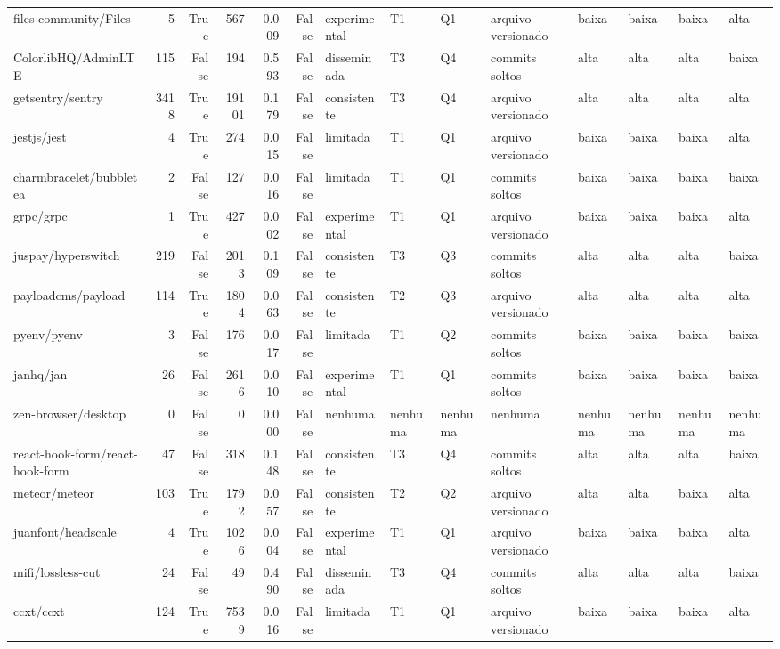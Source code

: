 \begin{tabular}{lrrrrrllllllll}
files-community/Files & 5 & True & 567 & 0.009 & False & experimental & T1 & Q1 & arquivo versionado & baixa & baixa & baixa & alta \\
ColorlibHQ/AdminLTE & 115 & False & 194 & 0.593 & False & disseminada & T3 & Q4 & commits soltos & alta & alta & alta & baixa \\
getsentry/sentry & 3418 & True & 19101 & 0.179 & False & consistente & T3 & Q4 & arquivo versionado & alta & alta & alta & alta \\
jestjs/jest & 4 & True & 274 & 0.015 & False & limitada & T1 & Q1 & arquivo versionado & baixa & baixa & baixa & alta \\
charmbracelet/bubbletea & 2 & False & 127 & 0.016 & False & limitada & T1 & Q1 & commits soltos & baixa & baixa & baixa & baixa \\
grpc/grpc & 1 & True & 427 & 0.002 & False & experimental & T1 & Q1 & arquivo versionado & baixa & baixa & baixa & alta \\
juspay/hyperswitch & 219 & False & 2013 & 0.109 & False & consistente & T3 & Q3 & commits soltos & alta & alta & alta & baixa \\
payloadcms/payload & 114 & True & 1804 & 0.063 & False & consistente & T2 & Q3 & arquivo versionado & alta & alta & alta & alta \\
pyenv/pyenv & 3 & False & 176 & 0.017 & False & limitada & T1 & Q2 & commits soltos & baixa & baixa & baixa & baixa \\
janhq/jan & 26 & False & 2616 & 0.010 & False & experimental & T1 & Q1 & commits soltos & baixa & baixa & baixa & baixa \\
zen-browser/desktop & 0 & False & 0 & 0.000 & False & nenhuma & nenhuma & nenhuma & nenhuma & nenhuma & nenhuma & nenhuma & nenhuma \\
react-hook-form/react-hook-form & 47 & False & 318 & 0.148 & False & consistente & T3 & Q4 & commits soltos & alta & alta & alta & baixa \\
meteor/meteor & 103 & True & 1792 & 0.057 & False & consistente & T2 & Q2 & arquivo versionado & alta & alta & baixa & alta \\
juanfont/headscale & 4 & True & 1026 & 0.004 & False & experimental & T1 & Q1 & arquivo versionado & baixa & baixa & baixa & alta \\
mifi/lossless-cut & 24 & False & 49 & 0.490 & False & disseminada & T3 & Q4 & commits soltos & alta & alta & alta & baixa \\
ccxt/ccxt & 124 & True & 7539 & 0.016 & False & limitada & T1 & Q1 & arquivo versionado & baixa & baixa & baixa & alta \\

\end{tabular}
